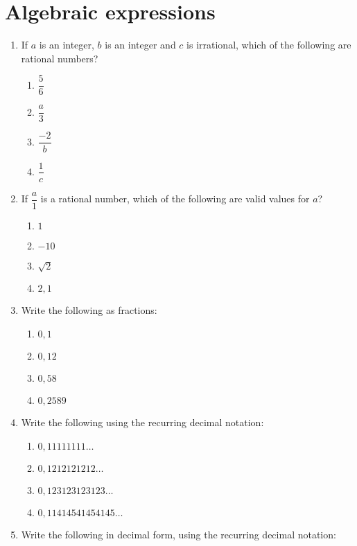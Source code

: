 \chapter{Algebraic expressions}
\begin{exercises}{}{
\begin{enumerate}[itemsep=5pt, label=\textbf{\arabic*}. ] 
\item If $a$ is an integer, $b$ is an integer and $c$ is irrational, which of the following are rational numbers? 
  \begin{enumerate}[itemsep=5pt, label=\textbf{(\alph*)} ] 
    \item $\dfrac{5}{6}$
    \item $\dfrac{a}{3}$
    \item $\dfrac{-2}{b}$
    \item $\dfrac{1}{c}$
    \end{enumerate}
\item If $\dfrac{a}{1}$ is a rational number, which of the following are valid values for $a$?
    \begin{enumerate}[itemsep=5pt, label=\textbf{(\alph*)} ] 
    \item $1$
    \item $-10$
    \item $\sqrt{2}$
    \item $2,1$
    \end{enumerate}
\item Write the following as fractions:
    \begin{enumerate}[itemsep=5pt, label=\textbf{(\alph*)} ] 
    \item $0,1$
    \item $0,12$
    \item $0,58$
    \item $0,2589$
    \end{enumerate}
\item Write the following using the recurring decimal notation:
    \begin{enumerate}[itemsep=5pt, label=\textbf{(\alph*)} ] 
    \item $0,11111111\ldots$
    \item $0,1212121212\ldots$
    \item $0,123123123123\ldots$
    \item $0,11414541454145\ldots$
    \end{enumerate}
\item Write the following in decimal form, using the recurring decimal notation:

\end{enumerate}}
\end{exercises}
